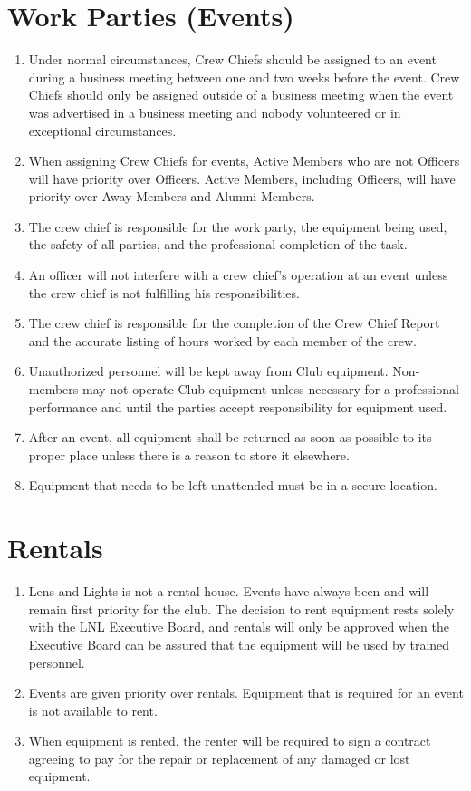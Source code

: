 \documentclass[12pt,letterpaper,oneside]{book}
\begin{document}
\section{Work Parties (Events)}

\begin{enumerate}

\item Under normal circumstances, Crew Chiefs should be assigned to an event during a business meeting between one and two weeks before the event. Crew Chiefs should only be assigned outside of a business meeting when the event was advertised in a business meeting and nobody volunteered or in exceptional circumstances.
\item When assigning Crew Chiefs for events, Active Members who are not Officers will have priority over Officers. Active Members, including Officers, will have priority over Away Members and Alumni Members.
\item The crew chief is responsible for the work party, the equipment being used, the safety of all parties, and the professional completion of the task.
\item An officer will not interfere with a crew chief's operation at an event unless the crew chief is not fulfilling his responsibilities.
\item The crew chief is responsible for the completion of the Crew Chief Report and the accurate listing of hours worked by each member of the crew.
\item Unauthorized personnel will be kept away from Club equipment. Non-members may not operate Club equipment unless necessary for a professional performance and until the parties accept responsibility for equipment used.
\item After an event, all equipment shall be returned as soon as possible to its proper place unless there is a reason to store it elsewhere.
\item Equipment that needs to be left unattended must be in a secure location. 

\end{enumerate}

\section{Rentals}

\begin{enumerate}

\item Lens and Lights is not a rental house. Events have always been and will remain first priority for the club. The decision to rent equipment rests solely with the LNL Executive Board, and rentals will only be approved when the Executive Board can be assured that the equipment will be used by trained personnel.
\item Events are given priority over rentals. Equipment that is required for an event is not available to rent.
\item When equipment is rented, the renter will be required to sign a contract agreeing to pay for the repair or replacement of any damaged or lost equipment.

\end{enumerate}
\end{document}
